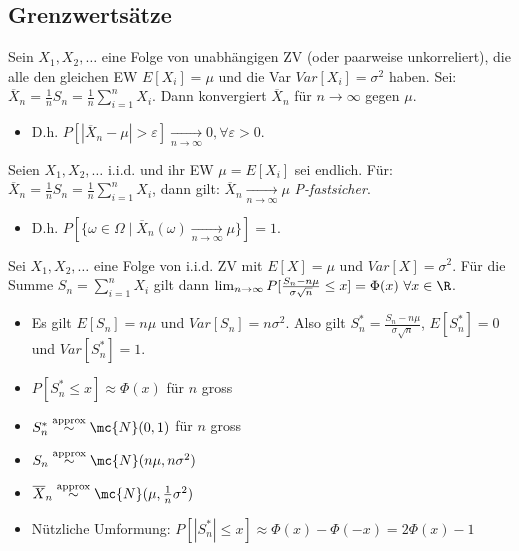 \subsection{Grenzwertsätze}
\begin{itemize}
     Sein $X_1, X_2, \dots$ eine Folge von unabhängigen ZV (oder paarweise unkorreliert), die alle den gleichen EW $E[X_i] = \mu$ und die Var $Var[X_i] = \sigma^2$ haben. Sei: $\overline{X}_n = \frac{1}{n} S_n = \frac{1}{n} \sum_{i=1}^{n} X_i$. Dann konvergiert $\overline{X}_n$ für $n \to \infty$ gegen $\mu$.
        \begin{itemize}
            \item  D.h. $P[|\overline{X}_n - \mu| > \varepsilon] \underset{n \to \infty}{\to} 0, \forall \varepsilon > 0$.
        \end{itemize}
     Seien $X_1, X_2, \dots$ i.i.d. und ihr EW $\mu = E[X_i]$ sei endlich. Für: $\overline{X}_n = \frac{1}{n} S_n = \frac{1}{n} \sum_{i=1}^{n} X_i$, dann gilt: $\overline{X}_n \underset{n \to \infty}{\to} \mu$ \textit{P-fastsicher}.
        \begin{itemize}
            \item D.h. $P[\{\omega \in \Omega \mid \overline{X}_n(\omega) \underset{n \to \infty}{\to} \mu\}] = 1$.
        \end{itemize}
     Sei $X_1, X_2, \dots$ eine Folge von i.i.d. ZV mit $E[X] = \mu$ und $Var[X] = \sigma^2$. Für die Summe $S_n = \sum_{i=1}^{n} X_i$ gilt dann $\lim_{n \to \infty} P[\frac{S_n - n \mu}{\sigma \sqrt{n}} \le x] = \Phi(x) \ \forall x \in \R$.
        \begin{itemize}
            \item Es gilt $E[S_n] = n\mu$ und $Var[S_n] = n\sigma^2$. Also gilt $S_n^* = \frac{S_n - n\mu}{\sigma \sqrt{n}}$, $E[S_n^*] = 0$ und $Var[S_n^*] = 1$.
            \item $P[S_n^* \le x] \approx \Phi(x)$ für $n$ gross
            \item $S_n^* \overset{\text{approx}}{\sim} \mc{N}(0,1)$ für $n$ gross
            \item $S_n \overset{\text{approx}}{\sim} \mc{N}(n \mu, n \sigma^2)$
            \item $\overline{X}_n \overset{\text{approx}}{\sim} \mc{N}(\mu, \frac{1}{n} \sigma^2)$
            \item Nützliche Umformung: $P[|S_n^*| \le x] \approx \Phi(x) - \Phi(-x) = 2 \Phi(x) - 1$
        \end{itemize}
\end{itemize}


